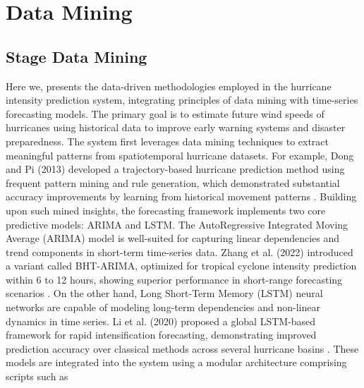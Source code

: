 %
%



\chapter{Data Mining}

\section{Stage Data Mining}



Here we, presents the data-driven methodologies employed in the hurricane intensity prediction system, integrating principles of data mining with time-series forecasting models. The primary goal is to estimate future wind speeds of hurricanes using historical data to improve early warning systems and disaster preparedness. The system first leverages data mining techniques to extract meaningful patterns from spatiotemporal hurricane datasets. For example, Dong and Pi (2013) developed a trajectory-based hurricane prediction method using frequent pattern mining and rule generation, which demonstrated substantial accuracy improvements by learning from historical movement patterns \cite{dong2013htpdm}. Building upon such mined insights, the forecasting framework implements two core predictive models: ARIMA and LSTM. The AutoRegressive Integrated Moving Average (ARIMA) model is well-suited for capturing linear dependencies and trend components in short-term time-series data. Zhang et al. (2022) introduced a variant called BHT-ARIMA, optimized for tropical cyclone intensity prediction within 6 to 12 hours, showing superior performance in short-range forecasting scenarios \cite{zhang2022bhtarima}. On the other hand, Long Short-Term Memory (LSTM) neural networks are capable of modeling long-term dependencies and non-linear dynamics in time series. Li et al. (2020) proposed a global LSTM-based framework for rapid intensification forecasting, demonstrating improved prediction accuracy over classical methods across several hurricane basins \cite{li2020lstmrapid}. These models are integrated into the system using a modular architecture comprising scripts such as


